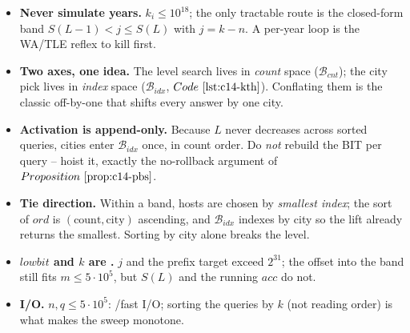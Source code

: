 \begin{hardeningbox}
\begin{itemize}[nosep,leftmargin=1.4em]
  \item \textbf{Never simulate years.} \(k_i\le 10^{18}\); the only tractable route
        is the closed-form band \(S(L-1)<j\le S(L)\) with \(j=k-n\). A per-year
        loop is the WA/TLE reflex to kill first.
  \item \textbf{Two axes, one idea.} The level search lives in \emph{count} space
        (\(\mathcal{B}_{\mathit{cnt}}\)); the city pick lives in \emph{index} space
        (\(\mathcal{B}_{\mathit{idx}}\), \(\coderef{c14-kth}\)). Conflating them is
        the classic off-by-one that shifts every answer by one city.
  \item \textbf{Activation is append-only.} Because \(L\) never decreases across
        sorted queries, cities enter \(\mathcal{B}_{\mathit{idx}}\) once, in count
        order. Do \emph{not} rebuild the BIT per query -- hoist it, exactly the
        no-rollback argument of \(\propref{c14-pbs}\).
  \item \textbf{Tie direction.} Within a band, hosts are chosen by \emph{smallest
        index}; the sort of \(\mathit{ord}\) is \((\text{count},\text{city})\)
        ascending, and \(\mathcal{B}_{\mathit{idx}}\) indexes by city so the lift
        already returns the smallest. Sorting by city alone breaks the level.
  \item \textbf{\(\mathit{lowbit}\) and \(k\) are .} \(j\) and the
        prefix target exceed \(2^{31}\); the offset into the band still fits
        \(m\le 5\cdot10^5\), but \(S(L)\) and the running \(\mathit{acc}\) do not.
  \item \textbf{I/O.} \(n,q\le 5\cdot10^5\): /fast I/O; sorting the
        queries by \(k\) (not reading order) is what makes the sweep monotone.
\end{itemize}
\end{hardeningbox}

